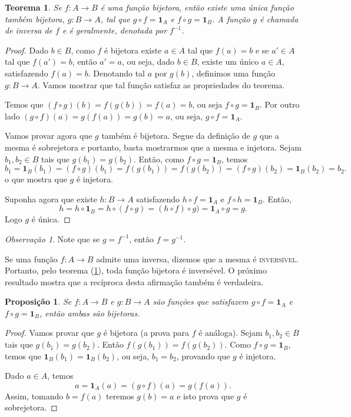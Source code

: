 \documentclass[a4paper,12pt]{monografia}
\theoremstyle{plain}
\newtheorem{theorem}{Teorema}[section]
\newtheorem{proposition}{Proposi\c{c}\~ao}[section]
\theoremstyle{definition}
\theoremstyle{remark}
\newtheorem{remark}{Observa\c{c}\~ao}[section]
\newcommand{\id}{\mathbf{1}}
\begin{document}
\begin{theorem}\label{inversa-func}
Se $f:A \rightarrow B$ \'e uma fun\c{c}\~ao bijetora, ent\~ao existe uma
\'unica fun\c{c}\~ao tamb\'em bijetora, $g:B \rightarrow A$, tal que $g
\circ f = \id_A$ e $f \circ g = \id_B$. A fun\c{c}\~ao $g$ \'e chamada de
inversa de $f$ e \'e geralmente, denotada por $f^{-1}$.
\end{theorem}
\begin{proof}
Dado $b \in B$, como $f$ \'e bijetora existe $a \in A$ tal que
$f(a)=b$ e se $a' \in A$ tal que $f(a')=b$, ent\~ao $a'=a$, ou seja,
dado $b \in B$, existe um \'unico $a \in A$, satisfazendo $f(a)=b$.
Denotando tal $a$ por $g(b)$, definimos uma fun\c{c}\~ao $g:B
\rightarrow A$. Vamos mostrar que tal fun\c{c}\~ao satisfaz as
propriedades do teorema.

Temos que $(f \circ g)(b)=f(g(b))=f(a)=b$, ou seja $f \circ
g=\id_B$. Por outro lado $(g \circ f)(a)=g(f(a))=g(b)=a$, ou seja,
$g \circ f=\id_A$.

Vamos provar agora que $g$ tamb\'em \'e bijetora. Segue da defini\c{c}\~ao
de $g$ que a mesma \'e sobrejetora e portanto, basta mostrarmos que
a mesma e injetora. Sejam $b_1,b_2 \in B$ tais que
$g(b_1)=g(b_2)$. Ent\~ao, como $f \circ g=\id_B$, temos
$$
b_1=\id_B(b_1)=(f \circ g)(b_1)=f(g(b_1))=f(g(b_2))=(f \circ
g)(b_2)=\id_B(b_2)=b_2.
$$
o que mostra que $g$ \'e injetora.

Suponha agora que existe $h:B \rightarrow A$ satisfazendo $h \circ
f = \id_A$ e $f \circ h = \id_B$. Ent\~ao,
$$
h=h \circ \id_B= h \circ (f \circ g)= (h \circ f) \circ g)=\id_A
\circ g= g.
$$
Logo $g$ \'e \'unica.
\end{proof}
\begin{remark}
Note que se $g=f^{-1}$, ent\~ao $f=g^{-1}$.
\end{remark}

Se uma fun\c{c}\~ao $f:A \rightarrow B$ admite uma inversa, dizemos que
a mesma \'e \textsc{invers\'ivel}. Portanto, pelo teorema
(\ref{inversa-func}), toda fun\c{c}\~ao bijetora \'e invers\'evel. O pr\'oximo
resultado mostra que a rec\'iproca desta afirma\c{c}\~ao tamb\'em \'e
verdadeira.

\begin{proposition}\label{comp-bije}
Se $f:A \rightarrow B$ e $g:B \rightarrow A$ s\~ao fun\c{c}\~oes que
satisfazem $g \circ f = \id_A$ e $f \circ g = \id_B$, ent\~ao ambas
s\~ao bijetoras.
\end{proposition}
\begin{proof}
Vamos provar que $g$ \'e bijetora (a prova para $f$ \'e an\'aloga).
Sejam $b_1, b_2 \in B$ tais que $g(b_1)=g(b_2)$. Ent\~ao
$f(g(b_1))=f(g(b_2))$. Como $f \circ g = \id_B$, temos que
$\id_B(b_1)=\id_B(b_2)$, ou seja, $b_1=b_2$, provando que $g$ \'e
injetora.

Dado $a \in A$, temos
$$
a=\id_A(a)=(g \circ f)(a)=g(f(a)).
$$
Assim, tomando $b=f(a)$ teremos $g(b)=a$ e isto prova que $g$ \'e
sobrejetora.
\end{proof}



\singlespacing



\end{document}
